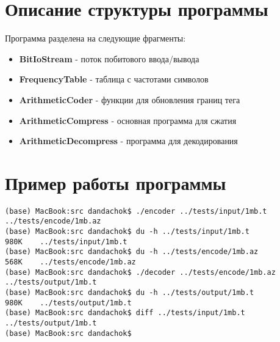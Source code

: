 \section*{Описание структуры программы}

Программа разделена на следующие фрагменты:
\begin{itemize}
    \item \textbf{BitIoStream} - поток побитового ввода/вывода
    \item \textbf{FrequencyTable} - таблица с частотами символов
    \item \textbf{ArithmeticCoder} - функции для обновления границ тега
    \item \textbf{ArithmeticCompress} - основная программа для сжатия
    \item \textbf{ArithmeticDecompress} - программа для декодирования
\end{itemize}

\section*{Пример работы программы}

\begin{lstlisting}
(base) MacBook:src dandachok$ ./encoder ../tests/input/1mb.t ../tests/encode/1mb.az
(base) MacBook:src dandachok$ du -h ../tests/input/1mb.t
980K    ../tests/input/1mb.t
(base) MacBook:src dandachok$ du -h ../tests/encode/1mb.az
568K    ../tests/encode/1mb.az
(base) MacBook:src dandachok$ ./decoder ../tests/encode/1mb.az ../tests/output/1mb.t
(base) MacBook:src dandachok$ du -h ../tests/output/1mb.t 
980K    ../tests/output/1mb.t
(base) MacBook:src dandachok$ diff ../tests/input/1mb.t ../tests/output/1mb.t
(base) MacBook:src dandachok$ 
\end{lstlisting}

\pagebreak